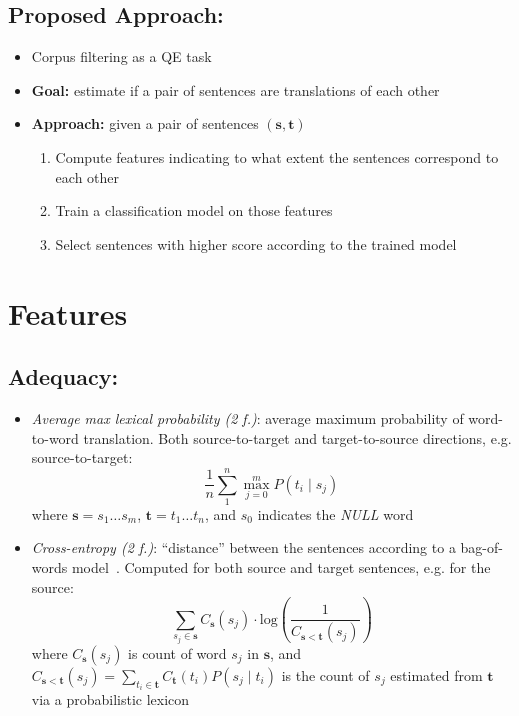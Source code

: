 \documentclass[a0]{sciposter}
\begin{document}
\begin{multicols*}{2}
\subsection*{Proposed Approach:}
\begin{itemize}
  \item Corpus filtering as a QE task
  \item {\bf Goal:} estimate if a pair of sentences are translations of each other
  \item {\bf Approach:} given a pair of sentences $(\mathbf{s}, \mathbf{t})$
  \begin{enumerate}
    \item Compute features indicating to what extent the sentences correspond to each other
    \item Train a classification model on those features
    \item Select sentences with higher score according to the trained model
  \end{enumerate}
\end{itemize}


\section*{\Large Features}
\subsection*{Adequacy:} 
\begin{itemize}
  \item \textit{Average max lexical probability (2 f.)}: average maximum probability of word-to-word translation. Both source-to-target and target-to-source directions, e.g. source-to-target:
  $$ \frac{1}{n}\sum_1^n\max_{j=0}^m P(t_i\mid s_j) $$
  where $\mathbf{s}=s_1\ldots s_m$, $\mathbf{t}=t_1\ldots t_n$, and $s_0$ indicates the \textit{NULL} word
  \item \textit{Cross-entropy (2 f.)}: ``distance'' between the sentences according to a bag-of-words model~\cite{Hainan17}. Computed for both source and target sentences, e.g. for the source:
  $$\sum_{s_j\in\mathbf{s}}C_{\mathbf{s}}(s_j)\cdot\mathrm{log}\left(\frac{1}{C_{\mathbf{s}<\mathbf{t}}(s_j)}\right)$$
  where $C_{\mathbf{s}}(s_j)$ is count of word $s_j$ in $\mathbf{s}$, and $C_{\mathbf{s}<\mathbf{t}}(s_j)=\sum_{t_i\in\mathbf{t}}C_{\mathbf{t}}(t_i)P(s_j\mid t_i)$ is the count of $s_j$ estimated from $\mathbf{t}$ via a probabilistic lexicon 
\end{itemize}


\end{multicols*}
\end{document}
